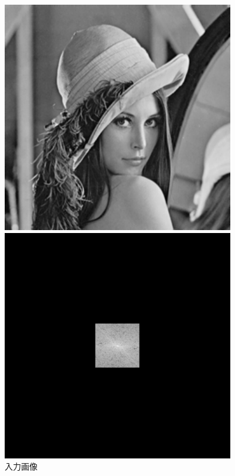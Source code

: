 \iffigure
\begin{figure}[h]
  \centering
  \begin{minipage}{.25\hsize}
    \includegraphics[clip, width=\textwidth]{figure/Lenna.pdf}
    \caption{入力画像}
    \label{fig:low_input}
  \end{minipage}
  \begin{minipage}{.25\hsize}
    \includegraphics[clip, width=\textwidth]{figure/low_pass_dft_2d.pdf}

\end{minipage}
\end{figure}
